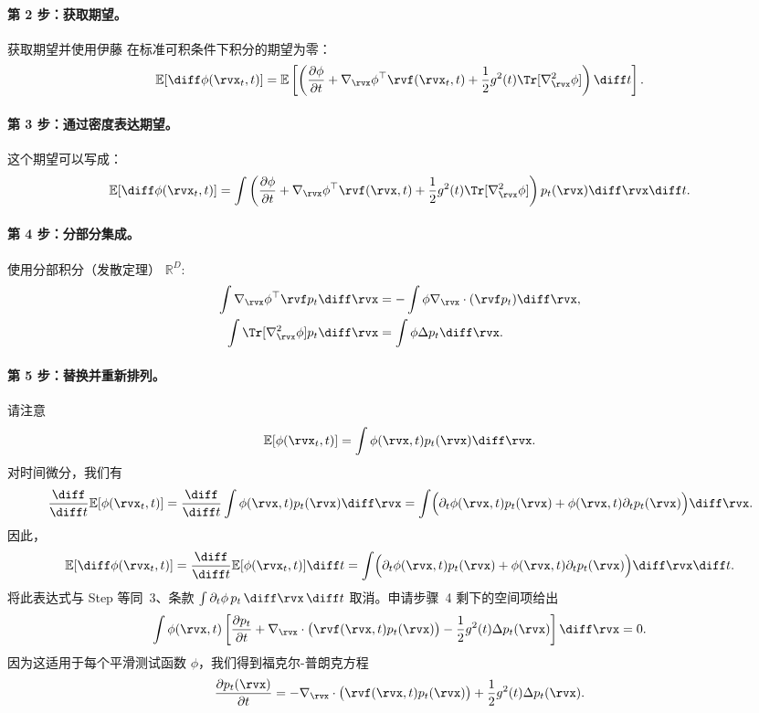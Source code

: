 \paragraph{第 2 步：获取期望。}
获取期望并使用伊藤 在标准可积条件下积分的期望为零：
\[
\mathbb{E}[\diff \phi(\rvx_t, t)] = \mathbb{E} \left[ \left( \frac{\partial \phi}{\partial t} + \nabla_{\rvx} \phi^\top \rvf(\rvx_t, t) + \frac{1}{2} g^2(t) \Tr[\nabla_{\rvx}^2 \phi] \right) \diff t \right].
\]
\paragraph{第 3 步：通过密度表达期望。}
这个期望可以写成：
\[
\mathbb{E}[\diff \phi(\rvx_t, t)] = \int \left( \frac{\partial \phi}{\partial t} + \nabla_{\rvx} \phi^\top \rvf(\rvx, t) + \frac{1}{2} g^2(t) \Tr[\nabla_{\rvx}^2 \phi] \right) p_t(\rvx) \diff \rvx \diff t.
\]
\paragraph{第 4 步：分部分集成。}
使用分部积分（发散定理） $\mathbb{R}^D$:
\begin{align*}
    \int \nabla_{\rvx} \phi^\top \rvf p_t \diff \rvx &= -\int \phi \nabla_{\rvx} \cdot (\rvf p_t) \diff \rvx, \\
    \int \Tr[\nabla_{\rvx}^2 \phi] p_t  \diff \rvx &= \int \phi \Delta p_t \diff \rvx.
\end{align*}
\paragraph{第 5 步：替换并重新排列。}
请注意
\[
\mathbb{E}[\phi(\rvx_t,t)] = \int \phi(\rvx,t) p_t(\rvx) \diff\rvx.
\]
对时间微分，我们有
\[
\frac{\diff}{\diff t}\mathbb{E}[\phi(\rvx_t,t)]
= \frac{\diff}{\diff t}\int \phi(\rvx,t) p_t(\rvx) \diff\rvx
= \int\Bigl(\partial_t\phi(\rvx,t) p_t(\rvx) + \phi(\rvx,t) \partial_t p_t(\rvx)\Bigr)\diff\rvx.
\]
因此，
\[
\mathbb{E}[\diff \phi(\rvx_t,t)]
= \frac{\diff}{\diff t}\mathbb{E}[\phi(\rvx_t,t)] \diff t
= \int\Bigl(\partial_t\phi(\rvx,t) p_t(\rvx) + \phi(\rvx,t) \partial_t p_t(\rvx)\Bigr)\diff\rvx \diff t.
\]
将此表达式与 Step 等同~3、条款
$\int \partial_t\phi\,p_t\,\diff\rvx\,\diff t$ 取消。申请步骤~4 剩下的空间项给出
\[
\int
\phi(\rvx,t)
\left[
\frac{\partial p_t}{\partial t}
+
\nabla_{\rvx}\cdot\bigl(\rvf(\rvx,t)p_t(\rvx)\bigr)
-
\frac{1}{2}g^2(t)\Delta p_t(\rvx)
\right]
\diff\rvx
=
0.
\]
因为这适用于每个平滑测试函数 $\phi$，我们得到福克尔-普朗克方程
\[
\frac{\partial p_t(\rvx)}{\partial t}
=
-\nabla_{\rvx}\cdot\bigl(\rvf(\rvx,t)p_t(\rvx)\bigr)
+
\frac{1}{2}g^2(t)\Delta p_t(\rvx).
\]

